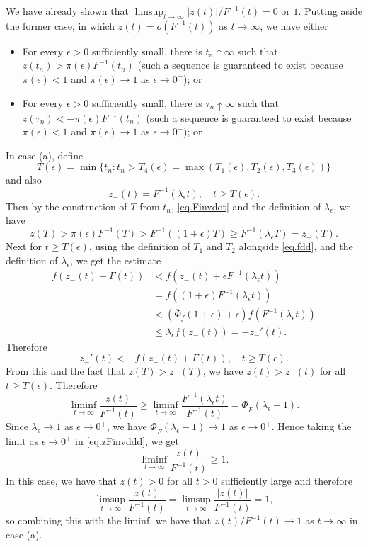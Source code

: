 \documentclass[a4paper,10pt,reqno]{amsart}
\numberwithin{equation}{section}
\theoremstyle{definition}
\theoremstyle{remark}
\DeclareMathOperator{\1}{\mathbbm 1}
\begin{document}
	We have already shown that $\limsup_{t\to\infty} |z(t)|/F^{-1}(t)=0$ or $1$. Putting aside the former case, in which $z(t)=o(F^{-1}(t))$ as $t\to\infty$, we have either 
	\begin{itemize}
		\item[(a)]  For every $\epsilon>0$ sufficiently small, there is $t_n\uparrow \infty$ such that $z(t_n)>\pi(\epsilon)F^{-1}(t_n)$ (such a sequence is guaranteed to exist because $\pi(\epsilon)<1$ and $\pi(\epsilon)\to 1$ as $\epsilon\to 0^+$); or
		\item[(b)] For every $\epsilon>0$ sufficiently small, there is $\tau_n\uparrow \infty$ such that $z(\tau_n)<-\pi(\epsilon)F^{-1}(t_n)$ (such a sequence is guaranteed to exist because $\pi(\epsilon)<1$ and $\pi(\epsilon)\to 1$ as $\epsilon\to 0^+$); or
	\end{itemize}
	In case (a), define 
	\[
	T(\epsilon)=\min\{t_n:t_n>T_4(\epsilon)=\max(T_1(\epsilon),T_2(\epsilon),T_3(\epsilon))\}
	\]
	and also 
	\[
	z_-(t)=F^{-1}(\lambda_\epsilon t), \quad t\geq T(\epsilon).
	\]	 
	Then by the construction of $T$ from $t_n$, \eqref{eq.Finvdot} and the definition of $\lambda_\epsilon$, we have 
	\[
	z(T)>\pi(\epsilon)F^{-1}(T)>F^{-1}((1+\epsilon)T)\geq F^{-1}(\lambda_\epsilon T)=z_-(T).
	\]	
	Next for $t\geq T(\epsilon)$, using the definition of $T_1$ and $T_2$ alongside \eqref{eq.fdd}, and the definition of $\lambda_\epsilon$, we get the estimate 
	\begin{align*}
		f(z_-(t)+\Gamma(t))&< f(z_-(t)+\epsilon F^{-1}(\lambda_\epsilon t))\\
		&=f((1+\epsilon)F^{-1}(\lambda_\epsilon t))\\
		&< (\overline{\Phi}_f(1+\epsilon)+\epsilon)f(F^{-1}(\lambda_\epsilon t))\\
		&\leq \lambda_\epsilon f(z_-(t))=-z_-'(t).
	\end{align*}
	Therefore
	\[
	z_-'(t)<-f(z_-(t)+\Gamma(t)), \quad t\geq T(\epsilon).
	\]
	From this and the fact that $z(T)>z_-(T)$, we have $z(t)>z_-(t)$ for all $t\geq T(\epsilon)$. Therefore
	\begin{equation} \label{eq.zFinvddd}
		\liminf_{t\to\infty} \frac{z(t)}{F^{-1}(t)}\geq 
		\liminf_{t\to\infty} \frac{F^{-1}(\lambda_\epsilon t)}{F^{-1}(t)}
		=\underline{\Phi}_F(\lambda_\epsilon-1).
	\end{equation}
	Since $\lambda_\epsilon\to 1$ as $\epsilon\to 0^+$, we have $\underline{\Phi}_F(\lambda_\epsilon-1)\to 1$ as $\epsilon\to 0^+$. 
	Hence taking the limit as $\epsilon \to 0^+$ in \eqref{eq.zFinvddd}, we get 
	\begin{equation*} 
		\liminf_{t\to\infty} \frac{z(t)}{F^{-1}(t)}\geq 
		1.
	\end{equation*}
	In this case, we have that $z(t)>0$ for all $t>0$ sufficiently large and therefore 
	\[
	\limsup_{t\to\infty} \frac{z(t)}{F^{-1}(t)}=
	\limsup_{t\to\infty} \frac{|z(t)|}{F^{-1}(t)}=1,
	\]
	so combining this with the liminf, we have that $z(t)/F^{-1}(t)\to 1$ as $t\to\infty$ in case (a).
	
\end{document}
